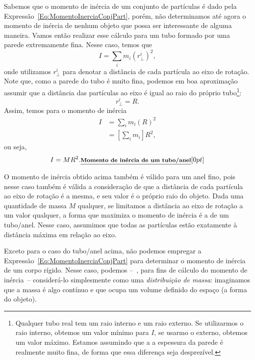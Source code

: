 Sabemos que o momento de inércia de um conjunto de partículas é dado pela Expressão~\eqref{Eq:MomentoInerciaConjPart}, porém, não determinamos até agora o momento de inércia de nenhum objeto que possa ser interessante de alguma maneira. Vamos então realizar esse cálculo para um tubo formado por uma parede extremamente fina. Nesse caso, temos que
\begin{equation}
    I = \sum_i m_i (r_\perp^i)^2,
\end{equation}
%
onde utilizamos $r_\perp^i$ para denotar a distância de cada partícula ao eixo de rotação. Note que, como a parede do tubo é muito fina, podemos em boa aproximação assumir que a distância das partículas ao eixo é igual ao raio do próprio tubo\footnote{Qualquer tubo real tem um raio interno e um raio externo. Se utilizarmos o raio interno, obtemos um valor mínimo para $I$, se usarmo o externo, obtemos um valor máximo. Estamos assumindo que a a espessura da parede é realmente muito fina, de forma que essa diferença seja desprezível.}:
\begin{equation}
    r_\perp^i = R.
\end{equation}
%
Assim, temos para o momento de inércia
\begin{align}
    I &= \sum_i m_i (R)^2 \\
    &= \left[\sum_i m_i\right] R^2,
\end{align}
%
ou seja,
\begin{equation}
    I = MR^2. \relax{\footnotesize\emph{\textbf{Momento de inércia de um tubo/anel}}}[0pt]
\end{equation}

O momento de inércia obtido acima também é válido para um anel fino, pois nesse caso também é válida a consideração de que a distância de cada partícula ao eixo de rotação é a mesma, e seu valor é o próprio raio do objeto. Dada uma quantidade de massa $M$ qualquer, se limitamos a distância ao eixo de rotação a um valor qualquer, a forma que maximiza o momento de inércia é a de um tubo/anel. Nesse caso, assumimos que todas as partículas estão exatamente à distância máxima em relação ao eixo.

Exceto para o caso do tubo/anel acima, não podemos empregar a Expressão~\eqref{Eq:MomentoInerciaConjPart} para determinar o momento de inércia de um corpo rígido. Nesse caso, podemos --~, para fins de cálculo do momento de inércia~-- considerá-lo simplesmente como uma \emph{distribuição de massa}: imaginamos que a massa é algo contínuo e que ocupa um volume definido do espaço (a forma do objeto).

